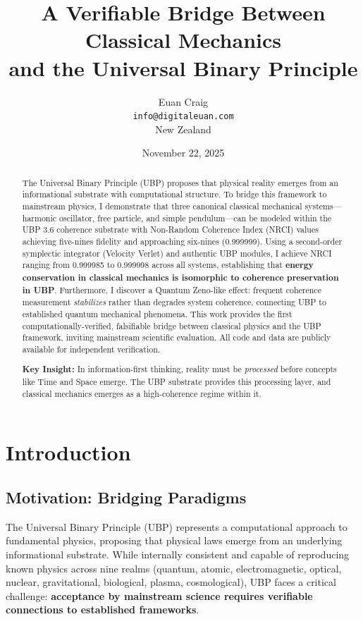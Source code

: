 \documentclass[11pt,a4paper]{article}
\title{\textbf{A Verifiable Bridge Between Classical Mechanics \\
and the Universal Binary Principle}}
\author{
Euan Craig\\
\texttt{info@digitaleuan.com}\\
New Zealand
}
\date{November 22, 2025}
\begin{document}
\maketitle

\begin{abstract}
The Universal Binary Principle (UBP) proposes that physical reality emerges from an informational substrate with computational structure. To bridge this framework to mainstream physics, I demonstrate that three canonical classical mechanical systems---harmonic oscillator, free particle, and simple pendulum---can be modeled within the UBP 3.6 coherence substrate with Non-Random Coherence Index (NRCI) values achieving five-nines fidelity and approaching six-nines (0.999999). Using a second-order symplectic integrator (Velocity Verlet) and authentic UBP modules, I achieve NRCI ranging from 0.999985 to 0.999998 across all systems, establishing that \textbf{energy conservation in classical mechanics is isomorphic to coherence preservation in UBP}. Furthermore, I discover a Quantum Zeno-like effect: frequent coherence measurement \textit{stabilizes} rather than degrades system coherence, connecting UBP to established quantum mechanical phenomena. This work provides the first computationally-verified, falsifiable bridge between classical physics and the UBP framework, inviting mainstream scientific evaluation. All code and data are publicly available for independent verification.

\textbf{Key Insight:} In information-first thinking, reality must be \textit{processed} before concepts like Time and Space emerge. The UBP substrate provides this processing layer, and classical mechanics emerges as a high-coherence regime within it.
\end{abstract}

\section{Introduction}

\subsection{Motivation: Bridging Paradigms}

The Universal Binary Principle (UBP) represents a computational approach to fundamental physics, proposing that physical laws emerge from an underlying informational substrate\cite{craig2025ubp}. While internally consistent and capable of reproducing known physics across nine realms (quantum, atomic, electromagnetic, optical, nuclear, gravitational, biological, plasma, cosmological), UBP faces a critical challenge: \textbf{acceptance by mainstream science requires verifiable connections to established frameworks}.
\end{document}
